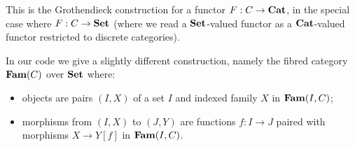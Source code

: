 \documentclass[nonacm]{acmart}
\begin{document}
\noindent This is the Grothendieck construction for a functor $F: C \to \mathbf{Cat}$, in the special case where $F: C
\to \mathbf{Set}$ (where we read a $\mathbf{Set}$-valued functor as a $\mathbf{Cat}$-valued functor restricted to discrete
categories).

In our code we give a slightly different construction, namely the fibred category $\mathbf{Fam}(C)$ over $\mathbf{Set}$ where:
\begin{itemize}
\item objects are pairs $(I, X)$ of a set $I$ and indexed family $X$ in $\mathbf{Fam}(I,C)$;
\item morphisms from $(I, X)$ to $(J, Y)$ are functions $f: I \to J$ paired with morphisms $X \to Y[f]$ in
$\mathbf{Fam}(I,C)$.
\end{itemize}
\end{document}
